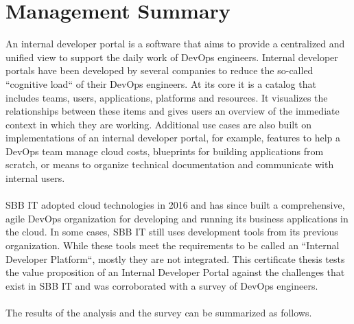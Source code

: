 \documentclass[a4paper,12pt]{article}
\begin{document}
    \section*{Management Summary}
    An internal developer portal is a software that aims to provide a centralized and unified view to support the daily
    work of DevOps engineers.
    Internal developer portals have been developed by several companies to reduce the so-called ``cognitive load`` of
    their DevOps engineers.
    At its core it is a catalog that includes teams, users, applications, platforms and resources.
    It visualizes the relationships between these items and gives users an overview of the immediate context in
    which they are working.
    Additional use cases are also built on implementations of an internal developer portal, for example, features
    to help a DevOps team manage cloud costs, blueprints for building applications from scratch, or means to organize
    technical documentation and communicate with internal users.\\ \\
    SBB IT adopted cloud technologies in 2016 and has since built a comprehensive, agile DevOps organization for
    developing and running its business applications in the cloud.
    In some cases, SBB IT still uses development tools from its previous organization.
    While these tools meet the requirements to be called an ``Internal Developer Platform``, mostly they are not integrated.
    This certificate thesis tests the value proposition of an Internal Developer Portal against the challenges that
    exist in SBB IT and was corroborated with a survey of DevOps engineers.  \\ \\
    The results of the analysis and the survey can be summarized as follows.
\end{document}
